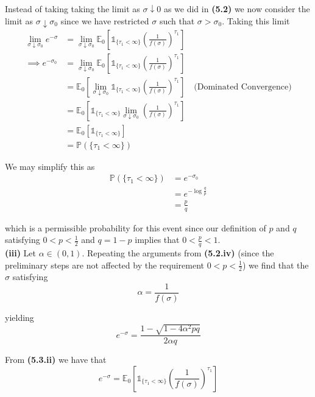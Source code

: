 \documentclass[12pt]{article}
\renewcommand{\P}{\mathbb P}
\newcommand{\E}{\mathbb E}
\begin{document}
Instead of taking taking the limit as $\sigma \downarrow 0$ as we did in {\bf (5.2)} we now consider the limit as $\sigma \downarrow \sigma_0$ since we have restricted $\sigma$ such that $\sigma > \sigma_0$. Taking this limit
\begin{align*}
	\lim_{\sigma\downarrow \sigma_0} e^{-\sigma} &= \lim_{\sigma\downarrow \sigma_0} \E_0 \left[ \mathds 1_{\{ \tau_1 < \infty \}} \left( \frac{1}{f(\sigma)} \right)^{\tau_1} \right] \\
	\implies e^{-\sigma_0} &= \lim_{\sigma \downarrow \sigma_0} \E_0 \left[ \mathds 1_{\{ \tau_1 < \infty \}} \left( \frac{1}{f(\sigma)} \right)^{\tau_1} \right] \\
	&= \E_0 \left[ \lim_{\sigma \downarrow \sigma_0} \mathds 1_{\{ \tau_1 < \infty \}} \left( \frac{1}{f(\sigma)} \right)^{\tau_1} \right] \quad \text{(Dominated Convergence)} \\
	&= \E_0 \left[ \mathds 1_{\{\tau_1 < \infty\}} \lim_{\sigma \downarrow \sigma_0} \left( \frac{1}{f(\sigma)} \right)^{\tau_1} \right] \\
	&= \E_0 \left[ \mathds 1_{\{\tau_1 < \infty \}} \right] \\
	&= \P \left( \{\tau_1 < \infty\} \right) 
\end{align*}

We may simplify this as
\begin{align*}
	\P \left( \{\tau_1 < \infty\} \right) &= e^{-\sigma_0} \\
	&= e^{-\log \frac{q}{p} } \\
	&= \frac{p}{q} 
\end{align*}

which is a permissible probability for this event since our definition of $p$ and $q$ satisfying $0 < p < \frac{1}{2}$ and $q = 1 - p$ implies that $0 < \frac{p}{q} < 1$. \\

{\bf (iii)} Let $\alpha \in (0,1)$. Repeating the arguments from {\bf (5.2.iv)} (since the preliminary steps are not affected by the requirement $0 < p < \frac{1}{2}$) we find that the $\sigma$ satisfying
\begin{equation*}
	\alpha = \frac{1}{f(\sigma)}
\end{equation*}

yielding
\begin{equation*}
	e^{-\sigma} = \frac{1 - \sqrt{1 - 4\alpha^2pq} }{ 2\alpha q }
\end{equation*}

From {\bf (5.3.ii)} we have that
\begin{equation*}
	e^{-\sigma} = \E_0 \left[ \mathds 1_{\{ \tau_1 < \infty \}} \left( \frac{1}{f(\sigma)} \right)^{\tau_1} \right] 
\end{equation*}
\end{document}
